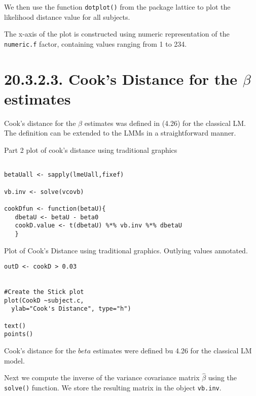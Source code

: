 \documentclass[a4paper,12pt]{article}
\begin{document}
We then use the function \texttt{dotplot()} from the package lattice to plot the 
likelihood distance value for all subjects.

The x-axis of the plot is constructed using numeric representation of the \texttt{numeric.f} factor, containing values ranging from 1 to 234.
\section{20.3.2.3. Cook's Distance for the $\beta$ estimates}

Cook's distance for the $\beta$ estimates was defined in (4.26) for the classical LM.
The definition can be extended to the LMMs in a straightforward manner.


Part 2 plot of cook's distance using traditional graphics


\begin{framed}
\begin{verbatim}

betaUall <- sapply(lmeUall,fixef)

vb.inv <- solve(vcovb)

cookDfun <- function(betaU){
   dbetaU <- betaU - beta0
   cookD.value <- t(dbetaU) %*% vb.inv %*% dbetaU
   }
\end{verbatim}
\end{framed}

Plot of Cook's Distance using traditional graphics. 
Outlying values annotated.

\begin{framed}
\begin{verbatim}
outD <- cookD > 0.03


#Create the Stick plot
plot(CookD ~subject.c, 
  ylab="Cook's Distance", type="h")

text()
points()
\end{verbatim}
\end{framed}

Cook's distance for the $beta$ estimates were defined bu 4.26 for the classical LM model.


Next we compute the inverse of the variance covariance matrix $\hat{\beta}$ using the \texttt{solve()} function.
We store the resulting matrix in the object \texttt{vb.inv}.
\end{document}
